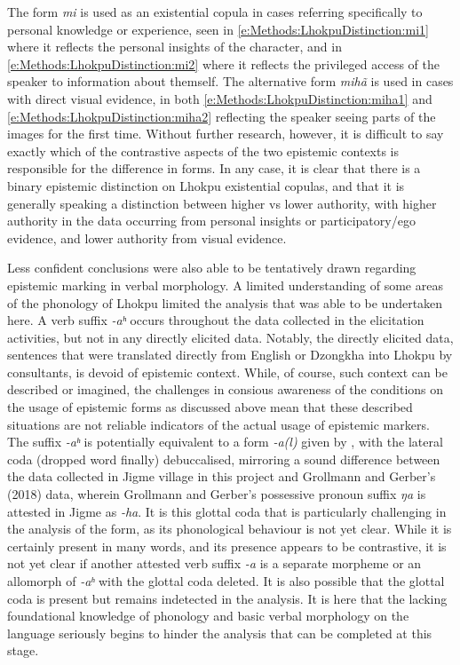 The form \textit{mi} is used as an existential copula in cases referring specifically to personal knowledge or experience, seen in \ref{e:Methods:LhokpuDistinction:mi1} where it reflects the personal insights of the character, and in \ref{e:Methods:LhokpuDistinction:mi2} where it reflects the privileged access of the speaker to information about themself. The alternative form \textit{mihã} is used in cases with direct visual evidence, in both \ref{e:Methods:LhokpuDistinction:miha1} and \ref{e:Methods:LhokpuDistinction:miha2} reflecting the speaker seeing parts of the images for the first time. Without further research, however, it is difficult to say exactly which of the contrastive aspects of the two epistemic contexts is responsible for the difference in forms. In any case, it is clear that there is a binary epistemic distinction on Lhokpu existential copulas, and that it is generally speaking a distinction between higher vs lower authority, with higher authority in the data occurring from personal insights or participatory/ego evidence, and lower authority from visual evidence.

Less confident conclusions were also able to be tentatively drawn regarding epistemic marking in verbal morphology. A limited understanding of some areas of the phonology of Lhokpu limited the analysis that was able to be undertaken here. A verb suffix \textit{-aʰ} occurs throughout the data collected in the elicitation activities, but not in any directly elicited data. Notably, the directly elicited data, sentences that were translated directly from English or Dzongkha into Lhokpu by consultants, is devoid of epistemic context. While, of course, such context can be described or imagined, the challenges in consious awareness of the conditions on the usage of epistemic forms as discussed above mean that these described situations are not reliable indicators of the actual usage of epistemic markers. The suffix \textit{-aʰ} is potentially equivalent to a form \textit{-a(l)} given by \cite{Grollmann2018}, with the lateral coda (dropped word finally) debuccalised, mirroring a sound difference between the data collected in Jigme village in this project and Grollmann and Gerber's (2018) data, wherein Grollmann and Gerber's possessive pronoun suffix \textit{ŋa} is attested in Jigme as \textit{-ha}. It is this glottal coda that is particularly challenging in the analysis of the form, as its phonological behaviour is not yet clear. While it is certainly present in many words, and its presence appears to be contrastive, it is not yet clear if another attested verb suffix \textit{-a} is a separate morpheme or an allomorph of \textit{-aʰ} with the glottal coda deleted. It is also possible that the glottal coda is present but remains indetected in the analysis. It is here that the lacking foundational knowledge of phonology and basic verbal morphology on the language seriously begins to hinder the analysis that can be completed at this stage.

